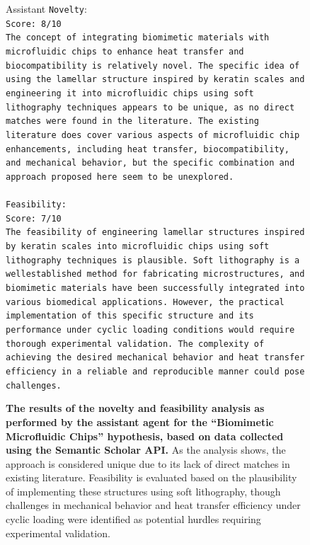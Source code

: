 \documentclass{article}
\begin{document}
\begin{figure}[h]
    \centering
\begin{Box1}[colbacktitle={white!90!white}, colback={black!3!white}]{Assistant}
\footnotesize{\texttt{Novelty}}:
\\
\footnotesize{\texttt{Score: 8/10}}
\\
\footnotesize{\texttt{The concept of integrating biomimetic materials with microfluidic chips to enhance heat transfer and biocompatibility is relatively novel. The specific idea of using the lamellar structure inspired by keratin scales and engineering it into microfluidic chips using soft lithography techniques appears to be unique, as no direct matches were found in the
literature. The existing literature does cover various aspects of microfluidic chip enhancements, including heat transfer, biocompatibility, and mechanical behavior, but the specific
combination and approach proposed here seem to be unexplored.}}
\\
\\
\footnotesize{\texttt{Feasibility:}}
\\
\footnotesize{\texttt{Score: 7/10}}
\\
\footnotesize{\texttt{The feasibility of engineering lamellar structures inspired by keratin scales into microfluidic chips using soft lithography techniques is plausible. Soft lithography is a wellestablished method for fabricating microstructures, and biomimetic materials have been successfully integrated into various biomedical applications.
However, the practical implementation of this specific structure and its performance under cyclic loading conditions would require thorough experimental validation. The
complexity of achieving the desired mechanical behavior and heat transfer efficiency in a reliable and reproducible manner could pose challenges.}}
\end{Box1}
    \caption{\textbf{The results of the novelty and feasibility analysis as performed by the assistant agent for the ``Biomimetic Microfluidic Chips'' hypothesis, based on data collected using the Semantic Scholar API.} As the analysis shows, the approach is considered unique due to its lack of direct matches in existing literature. Feasibility is evaluated based on the plausibility of implementing these structures using soft lithography, though challenges in mechanical behavior and heat transfer efficiency under cyclic loading were identified as potential hurdles requiring experimental validation.}
    \label{fig:heat_novelty}
\end{figure}
\end{document}
